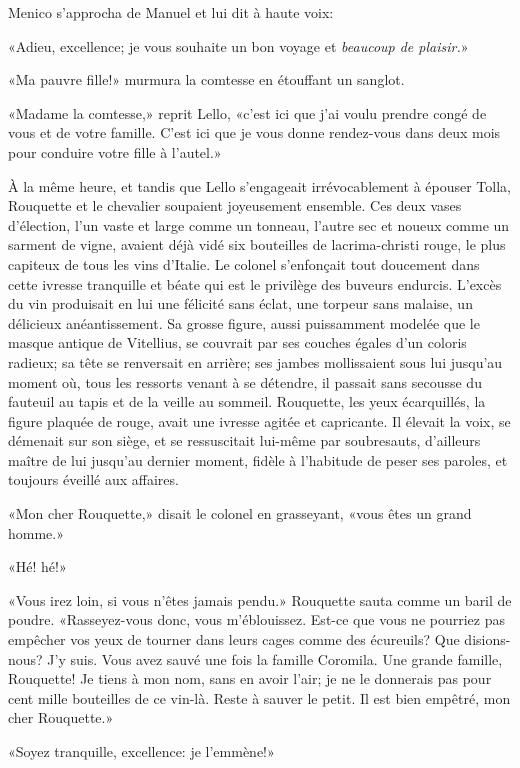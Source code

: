 Menico s'approcha de Manuel et lui dit à haute voix:

«Adieu, excellence; je vous souhaite un bon voyage et \emph{beaucoup de plaisir.}»

«Ma pauvre fille!» murmura la comtesse en étouffant un sanglot.

«Madame la comtesse,» reprit Lello, «c'est ici que j'ai voulu prendre congé de vous et de votre famille. C'est ici que je vous donne rendez-vous dans deux mois pour conduire votre fille à l'autel.»

À la même heure, et tandis que Lello s'engageait irrévocablement à épouser Tolla, Rouquette et le chevalier soupaient joyeusement ensemble. Ces deux vases d'élection, l'un vaste et large comme un tonneau, l'autre sec et noueux comme un sarment de vigne, avaient déjà vidé six bouteilles de lacrima-christi rouge, le plus capiteux de tous les vins d'Italie. Le colonel s'enfonçait tout doucement dans cette ivresse tranquille et béate qui est le privilège des buveurs endurcis. L'excès du vin produisait en lui une félicité sans éclat, une torpeur sans malaise, un délicieux anéantissement. Sa grosse figure, aussi puissamment modelée que le masque antique de Vitellius, se couvrait par ses couches égales d'un coloris radieux; sa tête se renversait en arrière; ses jambes mollissaient sous lui jusqu'au moment où, tous les ressorts venant à se détendre, il passait sans secousse du fauteuil au tapis et de la veille au sommeil. Rouquette, les yeux écarquillés, la figure plaquée de rouge, avait une ivresse agitée et capricante. Il élevait la voix, se démenait sur son siège, et se ressuscitait lui-même par soubresauts, d'ailleurs maître de lui jusqu'au dernier moment, fidèle à l'habitude de peser ses paroles, et toujours éveillé aux affaires.

«Mon cher Rouquette,» disait le colonel en grasseyant, «vous êtes un grand homme.»

«Hé! hé!»

«Vous irez loin, si vous n'êtes jamais pendu.» Rouquette sauta comme un baril de poudre. «Rasseyez-vous donc, vous m'éblouissez. Est-ce que vous ne pourriez pas empêcher vos yeux de tourner dans leurs cages comme des écureuils? Que disions-nous? J'y suis. Vous avez sauvé une fois la famille Coromila. Une grande famille, Rouquette! Je tiens à mon nom, sans en avoir l'air; je ne le donnerais pas pour cent mille bouteilles de ce vin-là. Reste à sauver le petit. Il est bien empêtré, mon cher Rouquette.»

«Soyez tranquille, excellence: je l'emmène!»

